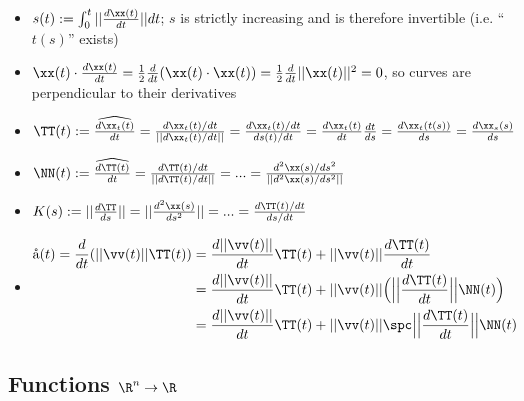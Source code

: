 \begin{itemize}
    \item $s(t) := \int_0^t ||\frac{d\xx(t)}{dt}|| dt$; $s$ is strictly increasing and is therefore invertible (i.e. ``$t(s)$'' exists)
    \item $\xx(t) \cdot \frac{d\xx(t)}{dt} = \frac{1}{2} \frac{d}{dt} (\xx(t) \cdot \xx(t)) = \frac{1}{2} \frac{d}{dt} ||\xx(t)||^2 = 0$, so curves are perpendicular to their derivatives
    \item $\TT(t) := \widehat{\frac{d\xx_t(t)}{dt}} = \frac{d\xx_t(t)/dt}{||d\xx_t(t)/dt||} = \frac{d\xx_t(t)/dt}{ds(t)/dt} = \frac{d\xx_t(t)}{dt} \frac{dt}{ds} = \frac{d\xx_t(t(s))}{ds} = \frac{d\xx_s(s)}{ds}$
    \item $\NN(t) := \widehat{\frac{d\TT(t)}{dt}} = \frac{d\TT(t)/dt}{||d\TT(t)/dt||} = ... = \frac{d^2\xx(s)/ds^2}{||d^2\xx(s)/ds^2||}$
    \item $K(s) := ||\frac{d\TT}{ds}|| = ||\frac{d^2\xx(s)}{ds^2}|| = ... = \frac{d\TT(t)/dt}{ds/dt}$
    \item 

    \begin{align*}
        \aa(t) = \frac{d}{dt}(||\vv(t)|| \TT(t)) &= \frac{d||\vv(t)||}{dt} \TT(t) + ||\vv(t)|| \frac{d\TT(t)}{dt} \\
        &= \frac{d||\vv(t)||}{dt} \TT(t) + ||\vv(t)|| \Big(\Big|\Big|\frac{d\TT(t)}{dt}\Big|\Big| \NN(t)\Big) \\
        &= \frac{d||\vv(t)||}{dt} \TT(t) + ||\vv(t)|| \spc \Big|\Big|\frac{d\TT(t)}{dt}\Big|\Big| \NN(t)
    \end{align*}
\end{itemize}

\subsection*{Functions $\R^n \rightarrow \R$}


